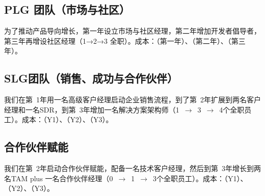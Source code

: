 \documentclass[11点, A4纸, 单面]{article}
\begin{document}
\subsection{PLG 团队（市场与社区）}
为了推动产品导向增长，第一年设立市场与社区经理，第二年增加开发者倡导者，第三年再增设社区经理（1→2→3 全职）。成本：\textbf{}（第一年）、\textbf{}（第二年）、\textbf{}（第三年）。



\subsection{SLG团队（销售、成功与合作伙伴）}
我们在第~1年用一名高级客户经理启动企业销售流程，到了第~2年扩展到两名客户经理和一名SDR，到第~3年增加一名解决方案架构师（1~$\rightarrow$~3~$\rightarrow$~4个全职员工）。成本：\textbf{}（Y1）、\textbf{}（Y2）、\textbf{}（Y3）。

\subsection{合作伙伴赋能}
我们在第~2年启动合作伙伴赋能，配备一名技术客户经理，然后到第~3年增长到两名TAM plus 一名合作伙伴经理（0~$\rightarrow$~1~$\rightarrow$~3个全职员工）。成本：\textbf{}（Y1）、\textbf{}（Y2）、\textbf{}（Y3）。
\end{document}

